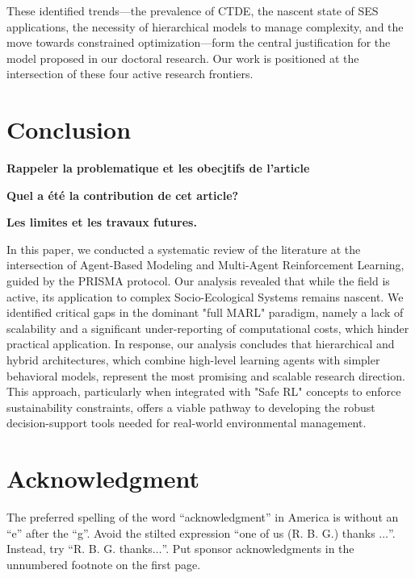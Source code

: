 \documentclass[conference]{IEEEtran}
\begin{document}
These identified trends---the prevalence of CTDE, the nascent state of SES applications, the necessity of hierarchical models to manage complexity, and the move towards constrained optimization---form the central justification for the model proposed in our doctoral research. Our work is positioned at the intersection of these four active research frontiers.

\section{Conclusion}

\textbf{Rappeler la problematique et les obecjtifs de l'article}

\textbf{Quel a été la contribution de cet article?}

\textbf{Les limites et les travaux futures.}

In this paper, we conducted a systematic review of the literature at the intersection of Agent-Based Modeling and Multi-Agent Reinforcement Learning, guided by the PRISMA protocol. Our analysis revealed that while the field is active, its application to complex Socio-Ecological Systems remains nascent. We identified critical gaps in the dominant "full MARL" paradigm, namely a lack of scalability and a significant under-reporting of computational costs, which hinder practical application. In response, our analysis concludes that hierarchical and hybrid architectures, which combine high-level learning agents with simpler behavioral models, represent the most promising and scalable research direction. This approach, particularly when integrated with "Safe RL" concepts to enforce sustainability constraints, offers a viable pathway to developing the robust decision-support tools needed for real-world environmental management.

\section*{Acknowledgment}

The preferred spelling of the word ``acknowledgment'' in America is without 
an ``e'' after the ``g''. Avoid the stilted expression ``one of us (R. B. 
G.) thanks $\ldots$''. Instead, try ``R. B. G. thanks$\ldots$''. Put sponsor 
acknowledgments in the unnumbered footnote on the first page.





\end{document}
